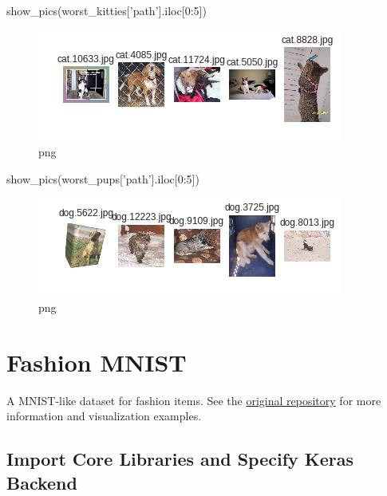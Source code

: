 \documentclass[]{book}
\newenvironment{Shaded}{\begin{snugshade}}{\end{snugshade}}
\newcommand{\DecValTok}[1]{\textcolor[rgb]{0.00,0.00,0.81}{#1}}
\newcommand{\StringTok}[1]{\textcolor[rgb]{0.31,0.60,0.02}{#1}}
\newcommand{\NormalTok}[1]{#1}
\theoremstyle{definition}
\theoremstyle{definition}
\theoremstyle{definition}
\theoremstyle{remark}
\begin{document}
\begin{Shaded}
\begin{Highlighting}[]
\NormalTok{show_pics(worst_kitties[}\StringTok{'path'}\NormalTok{].iloc[}\DecValTok{0}\NormalTok{:}\DecValTok{5}\NormalTok{])}
\end{Highlighting}
\end{Shaded}

\begin{figure}
\centering
\includegraphics{CNTK-Transfer-Cats-Dogs_files/CNTK-Transfer-Cats-Dogs_64_0.png}
\caption{png}
\end{figure}

\begin{Shaded}
\begin{Highlighting}[]
\NormalTok{show_pics(worst_pups[}\StringTok{'path'}\NormalTok{].iloc[}\DecValTok{0}\NormalTok{:}\DecValTok{5}\NormalTok{])}
\end{Highlighting}
\end{Shaded}

\begin{figure}
\centering
\includegraphics{CNTK-Transfer-Cats-Dogs_files/CNTK-Transfer-Cats-Dogs_65_0.png}
\caption{png}
\end{figure}

\chapter{Fashion MNIST}\label{fashion-mnist}

A MNIST-like dataset for fashion items. See the
\href{https://github.com/zalandoresearch/fashion-mnist}{original
repository} for more information and visualization examples.

\section{Import Core Libraries and Specify Keras
Backend}\label{import-core-libraries-and-specify-keras-backend}
\end{document}
